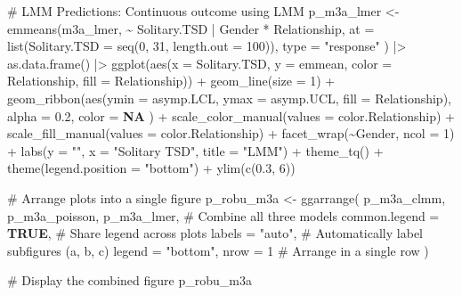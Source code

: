 \documentclass[
  bookmarksnumbered]{article}
\newenvironment{Shaded}{\begin{snugshade}}{\end{snugshade}}
\newcommand{\AttributeTok}[1]{\textcolor[rgb]{0.80,0.80,0.80}{#1}}
\newcommand{\CommentTok}[1]{\textcolor[rgb]{0.50,0.62,0.50}{#1}}
\newcommand{\ConstantTok}[1]{\textcolor[rgb]{0.86,0.64,0.64}{\textbf{#1}}}
\newcommand{\DecValTok}[1]{\textcolor[rgb]{0.86,0.86,0.80}{#1}}
\newcommand{\FloatTok}[1]{\textcolor[rgb]{0.75,0.75,0.82}{#1}}
\newcommand{\FunctionTok}[1]{\textcolor[rgb]{0.94,0.94,0.56}{#1}}
\newcommand{\NormalTok}[1]{\textcolor[rgb]{0.80,0.80,0.80}{#1}}
\newcommand{\OtherTok}[1]{\textcolor[rgb]{0.94,0.94,0.56}{#1}}
\newcommand{\SpecialCharTok}[1]{\textcolor[rgb]{0.86,0.64,0.64}{#1}}
\newcommand{\StringTok}[1]{\textcolor[rgb]{0.80,0.58,0.58}{#1}}
\begin{document}
\begin{Shaded}
\begin{Highlighting}[]
\CommentTok{\# LMM Predictions: Continuous outcome using LMM}
\NormalTok{p\_m3a\_lmer }\OtherTok{\textless{}{-}} \FunctionTok{emmeans}\NormalTok{(m3a\_lmer, }\SpecialCharTok{\textasciitilde{}}\NormalTok{ Solitary.TSD }\SpecialCharTok{|}\NormalTok{ Gender }\SpecialCharTok{*}\NormalTok{ Relationship,}
  \AttributeTok{at =} \FunctionTok{list}\NormalTok{(}\AttributeTok{Solitary.TSD =} \FunctionTok{seq}\NormalTok{(}\DecValTok{0}\NormalTok{, }\DecValTok{31}\NormalTok{, }\AttributeTok{length.out =} \DecValTok{100}\NormalTok{)), }\AttributeTok{type =} \StringTok{"response"}
\NormalTok{) }\SpecialCharTok{|\textgreater{}}
  \FunctionTok{as.data.frame}\NormalTok{() }\SpecialCharTok{|\textgreater{}}
  \FunctionTok{ggplot}\NormalTok{(}\FunctionTok{aes}\NormalTok{(}\AttributeTok{x =}\NormalTok{ Solitary.TSD, }\AttributeTok{y =}\NormalTok{ emmean, }\AttributeTok{color =}\NormalTok{ Relationship, }\AttributeTok{fill =}\NormalTok{ Relationship)) }\SpecialCharTok{+}
  \FunctionTok{geom\_line}\NormalTok{(}\AttributeTok{size =} \DecValTok{1}\NormalTok{) }\SpecialCharTok{+}
  \FunctionTok{geom\_ribbon}\NormalTok{(}\FunctionTok{aes}\NormalTok{(}\AttributeTok{ymin =}\NormalTok{ asymp.LCL, }\AttributeTok{ymax =}\NormalTok{ asymp.UCL, }\AttributeTok{fill =}\NormalTok{ Relationship),}
    \AttributeTok{alpha =} \FloatTok{0.2}\NormalTok{, }\AttributeTok{color =} \ConstantTok{NA}
\NormalTok{  ) }\SpecialCharTok{+}
  \FunctionTok{scale\_color\_manual}\NormalTok{(}\AttributeTok{values =}\NormalTok{ color.Relationship) }\SpecialCharTok{+}
  \FunctionTok{scale\_fill\_manual}\NormalTok{(}\AttributeTok{values =}\NormalTok{ color.Relationship) }\SpecialCharTok{+}
  \FunctionTok{facet\_wrap}\NormalTok{(}\SpecialCharTok{\textasciitilde{}}\NormalTok{Gender, }\AttributeTok{ncol =} \DecValTok{1}\NormalTok{) }\SpecialCharTok{+}
  \FunctionTok{labs}\NormalTok{(}\AttributeTok{y =} \StringTok{""}\NormalTok{, }\AttributeTok{x =} \StringTok{"Solitary TSD"}\NormalTok{, }\AttributeTok{title =} \StringTok{"LMM"}\NormalTok{) }\SpecialCharTok{+}
  \FunctionTok{theme\_tq}\NormalTok{() }\SpecialCharTok{+}
  \FunctionTok{theme}\NormalTok{(}\AttributeTok{legend.position =} \StringTok{"bottom"}\NormalTok{) }\SpecialCharTok{+}
  \FunctionTok{ylim}\NormalTok{(}\FunctionTok{c}\NormalTok{(}\FloatTok{0.3}\NormalTok{, }\DecValTok{6}\NormalTok{))}

\CommentTok{\# Arrange plots into a single figure}
\NormalTok{p\_robu\_m3a }\OtherTok{\textless{}{-}} \FunctionTok{ggarrange}\NormalTok{(}
\NormalTok{  p\_m3a\_clmm, p\_m3a\_poisson, p\_m3a\_lmer, }\CommentTok{\# Combine all three models}
  \AttributeTok{common.legend =} \ConstantTok{TRUE}\NormalTok{, }\CommentTok{\# Share legend across plots}
  \AttributeTok{labels =} \StringTok{"auto"}\NormalTok{, }\CommentTok{\# Automatically label subfigures (a, b, c)}
  \AttributeTok{legend =} \StringTok{"bottom"}\NormalTok{,}
  \AttributeTok{nrow =} \DecValTok{1} \CommentTok{\# Arrange in a single row}
\NormalTok{)}

\CommentTok{\# Display the combined figure}
\NormalTok{p\_robu\_m3a}
\end{Highlighting}
\end{Shaded}
\end{document}
